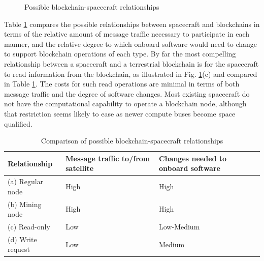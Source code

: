 \documentclass[]{aiaa-tc}%
\begin{document}
\begin{figure}[htb]%
 \caption{Possible blockchain-spacecraft relationships}
 \label{f:fig2-blockchain-arch}
\end{figure}

Table \ref{t:tab1-spacecraft-rels} compares the possible relationships between spacecraft and blockchains in terms of the relative amount of message traffic necessary to participate in each manner, and the relative degree to which onboard software would need to change to support blockchain operations of each type. By far the most compelling relationship between a spacecraft and a terrestrial blockchain is for the spacecraft to read information from the blockchain, as illustrated in Fig. \ref{f:fig2-blockchain-arch}(c) and compared in Table \ref{t:tab1-spacecraft-rels}. The costs for such read operations are minimal in terms of both message traffic and the degree of software changes. Most existing spacecraft do not have the computational capability to operate a blockchain node, although that restriction seems likely to ease as newer compute buses become space qualified.

\begin{center}
\begin{table}
\caption{Comparison of possible blockchain-spacecraft relationships}
 \label{t:tab1-spacecraft-rels}
\begin{center}
\begin{tabular}{lll}
\hline
Relationship    & Message traffic to/from satellite & Changes needed to onboard software \\
\hline
(a) Regular node      & High    & High      \\
(b) Mining node       & High     & High      \\
(c) Read-only       & Low     & Low-Medium      \\
(d) Write request & Low      & Medium       \\
\hline
\end{tabular}
\end{center}
\end{table}
\end{center}
\end{document}
